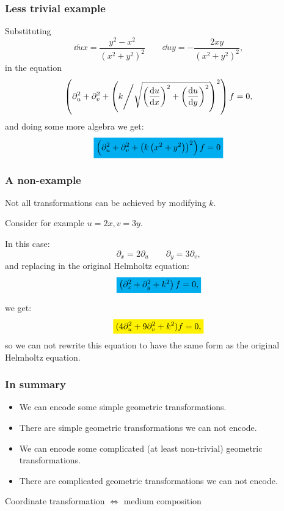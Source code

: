\documentclass{beamer}
\newcommand{\highlightcyan}[1]{\colorbox{cyan}{$\displaystyle #1$}}
\newcommand{\highlightyellow}[1]{\colorbox{yellow}{$\displaystyle #1$}}
\begin{document}
\begin{frame}
\frametitle{Less trivial example}
Substituting
\begin{equation*}\label{partialu}
	\dd{u}{x}=\frac{y^2-x^2}{(x^2+y^2)^2} \qquad
	\dd{u}{y}=-\frac{2xy}{(x^2+y^2)^2},
\end{equation*}
in the equation
\begin{equation*}
\left(
	\partial_u^2+\partial_v^2
	+\left(
	k\middle/\sqrt{\left(\frac{\mathrm{d}u}{\mathrm{d}x}\right)^2
	+\left(\frac{\mathrm{d}u}{\mathrm{d}y}\right)^2}
	\right)^2
\right)f=0,
\end{equation*}
and doing some more algebra we get:
\begin{equation*}
\highlightcyan{\left(
	\partial_u^2
	+\partial_v^2
	+\left(k\left(x^2+y^2\right)\right)^2
\right)f=0}
\end{equation*}
\end{frame}

\begin{frame}
\frametitle{A non-example}
Not all transformations can be achieved by modifying \(k\).

Consider for example \( u=2x,v=3y\).
\pause

In this case:
\begin{equation*}
	\partial_x=2\partial_u \qquad
	\partial_y=3\partial_v,
\end{equation*}
\pause
and replacing in the original Helmholtz equation:
\begin{equation*}
\highlightcyan{\left(\partial^2_x+\partial^2_y+k^2\right)f=0,}
\end{equation*}
\pause

we get:
\begin{equation*}
	\highlightyellow{(4\partial_u^2 + 9\partial_v^2 + k^2)f=0,}
\end{equation*}
\pause
so we can not rewrite this equation to have the same form as the original
Helmholtz equation.
\end{frame}

\begin{frame}
\frametitle{In summary}
\begin{itemize}
\item We can encode some simple geometric transformations.
\item There are simple geometric transformations we can not encode.
\item We can encode some complicated (at least non-trivial) geometric transformations.
\item There are complicated geometric transformations we can not encode.
\end{itemize}
\pause
\begin{framed}
\centering
Coordinate transformation $\iff$ medium composition
\end{framed}
\end{frame}
\end{document}
